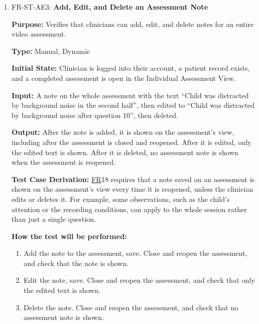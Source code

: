 \documentclass[12pt, titlepage]{article}
\newcommand{\srsfr}[1]{\href{https://github.com/Nour-Fawaz/MacaBoca/blob/main/pdfs/SRS/SRS.pdf}{FR}}
\renewcommand{\_}{\oldunderscore\allowbreak}
\begin{document}
\begin{enumerate}
  \item FR-ST-AE3: \textbf{Add, Edit, and Delete an Assessment Note\\}
  \begin{mdframed}[linewidth=0.5mm]
      \textbf{Purpose:} Verifies that clinicians can add, edit, and delete notes for an entire video assessment. \par
      \textbf{Type:} Manual, Dynamic \par
      \textbf{Initial State:} Clinician is logged into their account, a patient record exists, and a completed assessment is open in the Individual Assessment View. \par
      \textbf{Input:} A note on the whole assessment with the text ``Child was distracted by background noise in the second half'', then edited to ``Child was distracted by background noise after question 10'', then deleted. \par
      \textbf{Output:} After the note is added, it is shown on the assessment's view, including after the assessment is closed and reopened. After it is edited, only the edited text is shown. After it is deleted, no assessment note is shown when the assessment is reopened. \par
      \textbf{Test Case Derivation:} \srsfr*{18} requires that a note saved on an assessment is shown on the assessment's view every time it is reopened, unless the clinician edits or deletes it. For example, some observations, such as the child's attention or the recording conditions, can apply to the whole session rather than just a single question. \par
      \textbf{How the test will be performed:}
      \begin{enumerate}
        \item[1.] Add the note to the assessment, save. Close and reopen the assessment, and check that the note is shown.
        \item[2.] Edit the note, save. Close and reopen the assessment, and check that only the edited text is shown.
        \item[3.] Delete the note. Close and reopen the assessment, and check that no assessment note is shown.
      \end{enumerate}
  \end{mdframed}


\end{enumerate}
\end{document}
